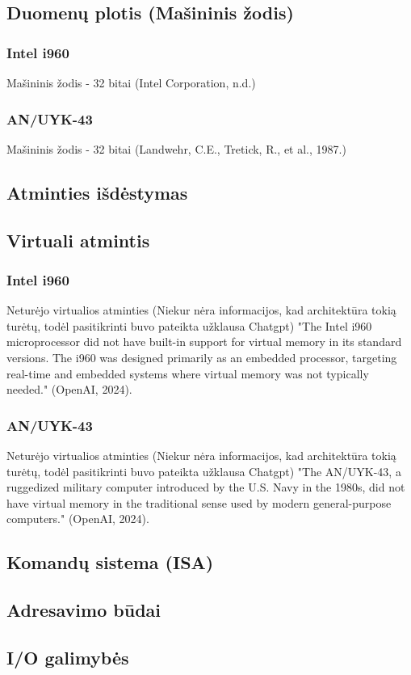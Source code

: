 \documentclass{article}
\begin{document}
\subsection{Duomenų plotis (Mašininis žodis)}
\subsubsection{Intel i960}
Mašininis žodis - 32 bitai (Intel Corporation, n.d.)
\subsubsection{AN/UYK-43}
Mašininis žodis - 32 bitai (Landwehr, C.E., Tretick, R., et al., 1987.)
\subsection{Atminties išdėstymas}
\subsection{Virtuali atmintis}
\subsubsection{Intel i960}
Neturėjo virtualios atminties (Niekur nėra informacijos, kad architektūra tokią turėtų, todėl pasitikrinti buvo pateikta užklausa Chatgpt) "The Intel i960 microprocessor did not have built-in support for virtual memory in its standard versions. The i960 was designed primarily as an embedded processor, targeting real-time and embedded systems where virtual memory was not typically needed." (OpenAI, 2024).
\subsubsection{AN/UYK-43}
Neturėjo virtualios atminties (Niekur nėra informacijos, kad architektūra tokią turėtų, todėl pasitikrinti buvo pateikta užklausa Chatgpt) "The AN/UYK-43, a ruggedized military computer introduced by the U.S. Navy in the 1980s, did not have virtual memory in the traditional sense used by modern general-purpose computers." (OpenAI, 2024).
\subsection{Komandų sistema (ISA)}
\subsection{Adresavimo būdai}
\subsection{I/O galimybės}
\end{document}
